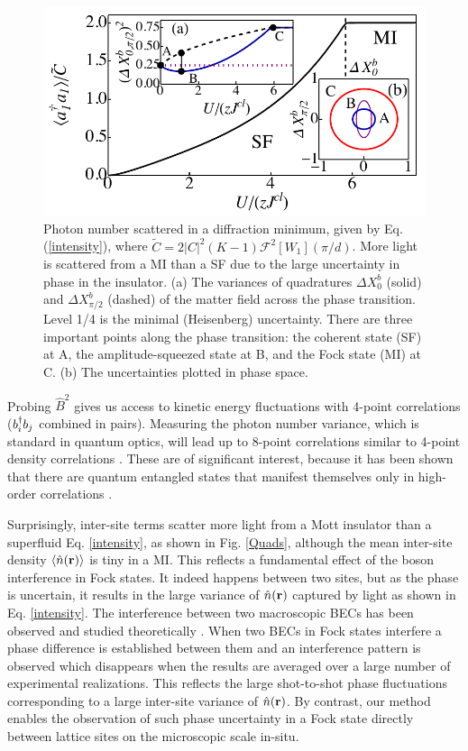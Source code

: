 \begin{figure}[htbp!]
  \centering
  \includegraphics[width=\linewidth]{Quads}
  \captionsetup{justification=centerlast,font=small}
  \caption[Mean-Field Matter Quadratures]{Photon number scattered in a
    diffraction minimum, given by Eq. (\ref{intensity}), where
    $\tilde{C} = 2 |C|^2 (K-1) \mathcal{F}^2 [W_1](\pi/d)$.  More
    light is scattered from a MI than a SF due to the large
    uncertainty in phase in the insulator. (a) The variances of
    quadratures $\Delta X^b_0$ (solid) and $\Delta X^b_{\pi/2}$
    (dashed) of the matter field across the phase transition. Level
    1/4 is the minimal (Heisenberg) uncertainty. There are three
    important points along the phase transition: the coherent state
    (SF) at A, the amplitude-squeezed state at B, and the Fock state
    (MI) at C. (b) The uncertainties plotted in phase space.}
	\label{Quads}
\end{figure}

Probing $\hat{B}^2$ gives us access to kinetic energy fluctuations
with 4-point correlations ($b^\dagger_i b_j$ combined in pairs). Measuring
the photon number variance, which is standard in quantum optics, will
lead up to 8-point correlations similar to 4-point density
correlations \cite{mekhov2007pra}. These are of significant interest,
because it has been shown that there are quantum entangled states that
manifest themselves only in high-order correlations
\cite{kaszlikowski2008}.

Surprisingly, inter-site terms scatter more light from a Mott
insulator than a superfluid Eq. \eqref{intensity}, as shown in
Fig. \eqref{Quads}, although the mean inter-site density
$\langle \hat{n}(\mathbf{r})\rangle $ is tiny in a MI. This reflects a
fundamental effect of the boson interference in Fock states. It indeed
happens between two sites, but as the phase is uncertain, it results
in the large variance of $\hat{n}(\mathbf{r})$ captured by light as shown
in Eq. \eqref{intensity}. The interference between two macroscopic
BECs has been observed and studied theoretically
\cite{horak1999}. When two BECs in Fock states interfere a phase
difference is established between them and an interference pattern is
observed which disappears when the results are averaged over a large
number of experimental realizations. This reflects the large
shot-to-shot phase fluctuations corresponding to a large inter-site
variance of $\hat{n}(\mathbf{r})$. By contrast, our method enables the
observation of such phase uncertainty in a Fock state directly between
lattice sites on the microscopic scale in-situ.

